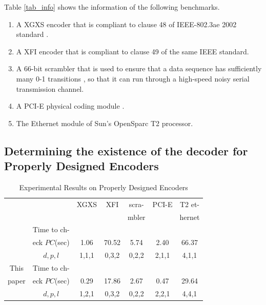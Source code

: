 \documentclass[journal]{IEEEtran}
\begin{document}
Table \ref{tab_info} shows the information of the following benchmarks.
\begin{enumerate}

\item A XGXS encoder that is compliant to clause 48 of IEEE-802.3ae 2002 standard \cite{IEEE80232002}.

\item A XFI encoder that is compliant to clause 49 of the same IEEE standard.

\item A 66-bit scrambler that is used to ensure
that a data sequence has sufficiently many 0-1 transitions
, so that it can run through a high-speed
noisy serial transmission channel.

\item A PCI-E physical coding module \cite{PCIESPEC}.

\item The Ethernet module of Sun's OpenSparc T2 processor.
\end{enumerate}

\subsection{Determining the existence of the decoder for Properly Designed Encoders}\label{subsec_prop}
\begin{table}[b]
\centering
\caption{Experimental Results on Properly Designed Encoders}
\begin{tabular}{|c|c|c|c|c|c|c|}
\hline
&                                        &XGXS     &XFI       &scra-     &PCI-E    &T2 et-\\
&                                        &         &          &mbler     &        &hernet\\ \hline
&Time to ch-                           &&&&&\\
\cite{ShengYuShen:fmcad10}&eck $PC$(sec)     &1.06     &70.52     &5.74      &2.40    &66.37\\\cline{2-7}
&$d,p,l$                                 &1,1,1    &0,3,2     &0,2,2     &2,1,1   &4,1,1         \\ \hline\hline
This&Time to ch-                         &&&&&\\
paper&eck $PC$(sec)                           &0.29     &17.86     &2.67      &0.47    &29.64\\\cline{2-7}
&$d,p,l$                                 &1,2,1    &0,3,2     &0,2,2     &2,2,1   &4,4,1          \\ \hline
\end{tabular}\label{tab_prodes}
\end{table}
\end{document}
